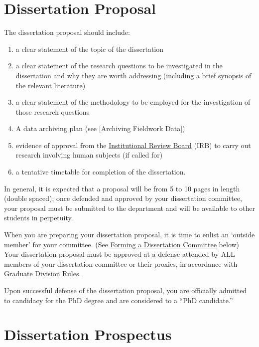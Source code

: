 \documentclass[
]{book}
\providecommand{\tightlist}{%
  \setlength{\itemsep}{0pt}\setlength{\parskip}{0pt}}
\begin{document}
\section{Dissertation Proposal}\label{dissertation-proposal}

The dissertation proposal should include:

\begin{enumerate}
\def\labelenumi{\arabic{enumi}.}
\tightlist
\item
  a clear statement of the topic of the dissertation
\item
  a clear statement of the research questions to be investigated in the dissertation and why they are worth addressing (including a brief synopsis of the relevant literature)
\item
  a clear statement of the methodology to be employed for the investigation of those research questions
\item
  A data archiving plan (see {[}Archiving Fieldwork Data{]})
\item
  evidence of approval from the \hyperref[IRB]{Institutional Review Board} (IRB) to carry out research involving human subjects (if called for)
\item
  a tentative timetable for completion of the dissertation.
\end{enumerate}

In general, it is expected that a proposal will be from 5 to 10 pages in length (double spaced); once defended and approved by your dissertation committee, your proposal must be submitted to the department and will be available to other students in perpetuity.

When you are preparing your dissertation proposal, it is time to enlist an `outside member' for your committee. (See \hyperref[forming-a-dissertation-committee]{Forming a Dissertation Committee} below) Your dissertation proposal must be approved at a defense attended by ALL members of your dissertation committee or their proxies, in accordance with Graduate Division Rules.

Upon successful defense of the dissertation proposal, you are officially admitted to candidacy for the PhD degree and are considered to a ``PhD candidate.''

\section{Dissertation Prospectus}\label{dissertation-prospectus}
\end{document}
